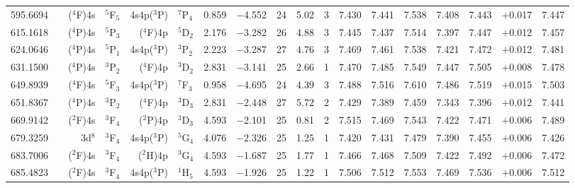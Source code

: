 \documentclass[traditabstract]{aa}
\newcommand{\pst}{\phantom{*}}
\begin{document}
\begin{center}
\begin{mpsupertabular}{r@{}c@{\ \ \ }r@{~}l@{\ }r@{~}l@{\ \ \ }c@{\ \ \ }c@{\ \ \ }c@{\ \ \ }c@{\ \ \ }c@{\ \ \ }c@{\ \ \ }c@{\ \ \ }c@{\ \ \ }c@{\ \ \ }c@{\ \ \ }r@{\ \ \ }c}
595.6694 & & \footnotesize($^4$F)4s  &\footnotesize$^5$F$_5$             &\footnotesize4s4p($^3$P)&\footnotesize$^7$P$_4$             & 0.859 & $-$4.552 & 24 & 5.02 & 3\pst      & 7.430 & 7.441 & 7.538 & 7.408 & 7.443 & $+$0.017    & 7.447 \\ 
615.1618 & & \footnotesize($^4$P)4s  &\footnotesize$^5$P$_3$             &\footnotesize($^4$F)4p  &\footnotesize$^5$D$_2$             & 2.176 & $-$3.282 & 26 & 4.88 & 3\pst      & 7.445 & 7.437 & 7.514 & 7.397 & 7.447 & $+$0.012    & 7.457 \\ 
624.0646 & & \footnotesize($^4$P)4s  &\footnotesize$^5$P$_1$             &\footnotesize4s4p($^3$P)&\footnotesize$^3$P$_2$             & 2.223 & $-$3.287 & 27 & 4.76 & 3\pst      & 7.469 & 7.461 & 7.538 & 7.421 & 7.472 & $+$0.012    & 7.481 \\ 
631.1500 & & \footnotesize($^4$P)4s  &\footnotesize$^3$P$_2$             &\footnotesize ($^4$F)4p &\footnotesize$^3$D$_2$             & 2.831 & $-$3.141 & 25 & 2.66 & 1\pst      & 7.470 & 7.485 & 7.549 & 7.447 & 7.505 & $+$0.008    & 7.478 \\ 
649.8939 & & \footnotesize($^4$F)4s  &\footnotesize$^5$F$_3$             &\footnotesize4s4p($^3$P)&\footnotesize$^7$F$_3$             & 0.958 & $-$4.695 & 24 & 4.39 & 3\pst      & 7.488 & 7.516 & 7.610 & 7.486 & 7.519 & $+$0.015    & 7.503 \\ 
651.8367 & & \footnotesize($^4$P)4s  &\footnotesize$^3$P$_2$             &\footnotesize($^4$F)4p  &\footnotesize$^3$D$_3$             & 2.831 & $-$2.448 & 27 & 5.72 & 2\pst      & 7.429 & 7.389 & 7.459 & 7.343 & 7.396 & $+$0.012    & 7.441 \\ 
669.9142 & & \footnotesize($^2$F)4s  &\footnotesize$^3$F$_4$             &\footnotesize($^2$P)4p  &\footnotesize$^3$D$_3$             & 4.593 & $-$2.101 & 25 & 0.81 & 2\pst      & 7.515 & 7.469 & 7.543 & 7.422 & 7.471 & $+$0.006    & 7.489 \\ 
679.3259 & & \footnotesize3d$^8$     &\footnotesize$^3$F$_4$             &\footnotesize4s4p($^3$P)&\footnotesize$^5$G$_4$             & 4.076 & $-$2.326 & 25 & 1.25 & 1\pst      & 7.420 & 7.431 & 7.479 & 7.390 & 7.455 & $+$0.006    & 7.426 \\ 
683.7006 & & \footnotesize($^2$F)4s  &\footnotesize$^3$F$_4$             &\footnotesize($^2$H)4p  &\footnotesize$^3$G$_4$             & 4.593 & $-$1.687 & 25 & 1.77 & 1\pst      & 7.466 & 7.468 & 7.509 & 7.422 & 7.492 & $+$0.006    & 7.472 \\ 
685.4823 & & \footnotesize($^2$F)4s  &\footnotesize$^3$F$_4$             &\footnotesize4s4p($^3$P)&\footnotesize$^1$H$_5$             & 4.593 & $-$1.926 & 25 & 1.22 & 1\pst      & 7.506 & 7.512 & 7.553 & 7.469 & 7.536 & $+$0.006    & 7.512 \\ 

\end{mpsupertabular}
\end{center}
\end{document}
